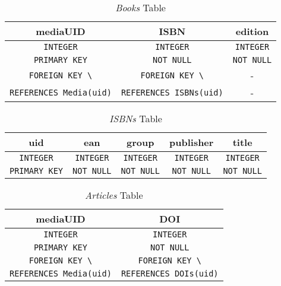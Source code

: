 \documentclass[11pt, a4paper]{article}
\begin{document}
    \begin{table}[H]
        \centering
        \begin{tabular}{|c|c|c|}
            \hline
            \textbf{mediaUID}                   & \textbf{ISBN}                       & \textbf{edition}       \\\hline\hline
            {\lstinline|INTEGER|}               & {\lstinline|INTEGER|}               & {\lstinline|INTEGER|}  \\\hline
            {\lstinline|PRIMARY KEY|}           & {\lstinline|NOT NULL|}              & {\lstinline|NOT NULL|} \\
            {\lstinline|FOREIGN KEY \|}         & {\lstinline|FOREIGN KEY \|}         & -                      \\
            {\lstinline|REFERENCES Media(uid)|} & {\lstinline|REFERENCES ISBNs(uid)|} & -                      \\\hline
        \end{tabular}
        \caption{\textit{Books} Table}
        \label{tab:sqlite_table_Books}
    \end{table}

    \begin{table}[H]
        \centering
        \begin{tabular}{|c|c|c|c|c|}
            \hline
            \textbf{uid}              & \textbf{ean}           & \textbf{group}         & \textbf{publisher}     & \textbf{title}         \\\hline\hline
            {\lstinline|INTEGER|}     & {\lstinline|INTEGER|}  & {\lstinline|INTEGER|}  & {\lstinline|INTEGER|}  & {\lstinline|INTEGER|}  \\\hline
            {\lstinline|PRIMARY KEY|} & {\lstinline|NOT NULL|} & {\lstinline|NOT NULL|} & {\lstinline|NOT NULL|} & {\lstinline|NOT NULL|} \\\hline
        \end{tabular}
        \caption{\textit{ISBNs} Table}
        \label{tab:sqlite_table_ISBNs}
    \end{table}

    \begin{table}[H]
        \centering
        \begin{tabular}{|c|c|}
            \hline
            \textbf{mediaUID}                   & \textbf{DOI}                       \\\hline\hline
            {\lstinline|INTEGER|}               & {\lstinline|INTEGER|}              \\\hline
            {\lstinline|PRIMARY KEY|}           & {\lstinline|NOT NULL|}             \\
            {\lstinline|FOREIGN KEY \|}         & {\lstinline|FOREIGN KEY \|}        \\
            {\lstinline|REFERENCES Media(uid)|} & {\lstinline|REFERENCES DOIs(uid)|} \\\hline
        \end{tabular}
        \caption{\textit{Articles} Table}
        \label{tab:sqlite_table_Articles}
    \end{table}
\end{document}
